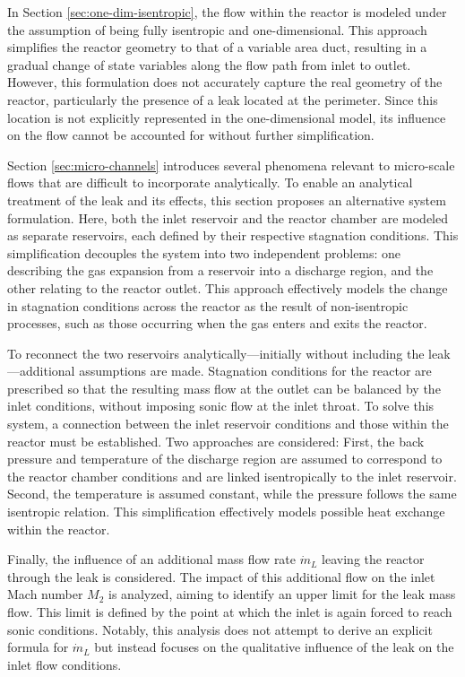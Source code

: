 In Section \ref{sec:one-dim-isentropic}, the flow within the reactor is modeled under the assumption of being fully isentropic and one-dimensional. This approach simplifies the reactor geometry to that of a variable area duct, resulting in a gradual change of state variables along the flow path from inlet to outlet. However, this formulation does not accurately capture the real geometry of the reactor, particularly the presence of a leak located at the perimeter. Since this location is not explicitly represented in the one-dimensional model, its influence on the flow cannot be accounted for without further simplification.

Section \ref{sec:micro-channels} introduces several phenomena relevant to micro-scale flows that are difficult to incorporate analytically. To enable an analytical treatment of the leak and its effects, this section proposes an alternative system formulation. Here, both the inlet reservoir and the reactor chamber are modeled as separate reservoirs, each defined by their respective stagnation conditions. This simplification decouples the system into two independent problems: one describing the gas expansion from a reservoir into a discharge region, and the other relating to the reactor outlet. This approach effectively models the change in stagnation conditions across the reactor as the result of non-isentropic processes, such as those occurring when the gas enters and exits the reactor.

To reconnect the two reservoirs analytically—initially without including the leak—additional assumptions are made. Stagnation conditions for the reactor are prescribed so that the resulting mass flow at the outlet can be balanced by the inlet conditions, without imposing sonic flow at the inlet throat. To solve this system, a connection between the inlet reservoir conditions and those within the reactor must be established. Two approaches are considered: First, the back pressure and temperature of the discharge region are assumed to correspond to the reactor chamber conditions and are linked isentropically to the inlet reservoir. Second, the temperature is assumed constant, while the pressure follows the same isentropic relation. This simplification effectively models possible heat exchange within the reactor.

Finally, the influence of an additional mass flow rate $\dot{m}_L$ leaving the reactor through the leak is considered. The impact of this additional flow on the inlet Mach number $M_2$ is analyzed, aiming to identify an upper limit for the leak mass flow. This limit is defined by the point at which the inlet is again forced to reach sonic conditions. Notably, this analysis does not attempt to derive an explicit formula for $\dot{m}_L$ but instead focuses on the qualitative influence of the leak on the inlet flow conditions.
\newpage


